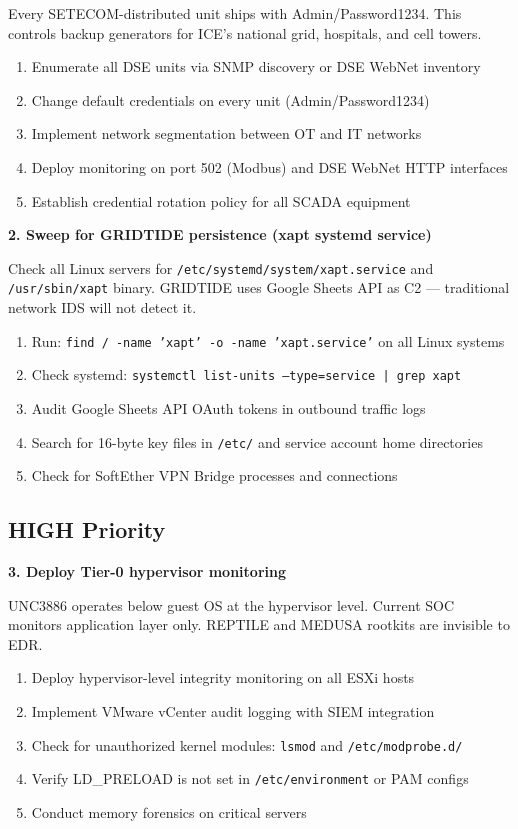 \documentclass[11pt,a4paper]{article}
\begin{document}
Every SETECOM-distributed unit ships with Admin/Password1234. This controls backup generators for ICE's national grid, hospitals, and cell towers.

\begin{enumerate}[label=\alph*., leftmargin=1.5cm]
\item Enumerate all DSE units via SNMP discovery or DSE WebNet inventory
\item Change default credentials on every unit (Admin/Password1234)
\item Implement network segmentation between OT and IT networks
\item Deploy monitoring on port 502 (Modbus) and DSE WebNet HTTP interfaces
\item Establish credential rotation policy for all SCADA equipment
\end{enumerate}

\textbf{2. Sweep for GRIDTIDE persistence (xapt systemd service)}

Check all Linux servers for \texttt{/etc/systemd/system/xapt.service} and \texttt{/usr/sbin/xapt} binary. GRIDTIDE uses Google Sheets API as C2 --- traditional network IDS will not detect it.

\begin{enumerate}[label=\alph*., leftmargin=1.5cm]
\item Run: \texttt{find / -name 'xapt' -o -name 'xapt.service'} on all Linux systems
\item Check systemd: \texttt{systemctl list-units --type=service | grep xapt}
\item Audit Google Sheets API OAuth tokens in outbound traffic logs
\item Search for 16-byte key files in \texttt{/etc/} and service account home directories
\item Check for SoftEther VPN Bridge processes and connections
\end{enumerate}

\subsection{HIGH Priority}

\textbf{3. Deploy Tier-0 hypervisor monitoring}

UNC3886 operates below guest OS at the hypervisor level. Current SOC monitors application layer only. REPTILE and MEDUSA rootkits are invisible to EDR.

\begin{enumerate}[label=\alph*., leftmargin=1.5cm]
\item Deploy hypervisor-level integrity monitoring on all ESXi hosts
\item Implement VMware vCenter audit logging with SIEM integration
\item Check for unauthorized kernel modules: \texttt{lsmod} and \texttt{/etc/modprobe.d/}
\item Verify LD\_PRELOAD is not set in \texttt{/etc/environment} or PAM configs
\item Conduct memory forensics on critical servers
\end{enumerate}
\end{document}
